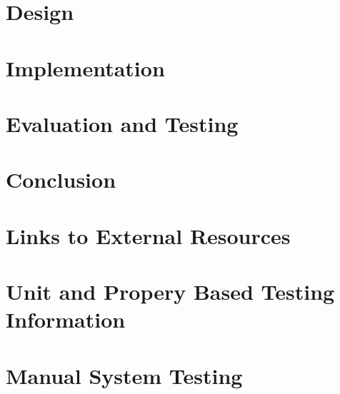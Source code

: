 \documentclass{l4proj}
\begin{document}
\chapter{Design}

\chapter{Implementation}

\chapter{Evaluation and Testing} 

\chapter{Conclusion}    

%
% 

\begin{appendices}

\chapter{Links to External Resources}

\chapter{Unit and Propery Based Testing Information}

\chapter{Manual System Testing}


\end{appendices}






\end{document}
